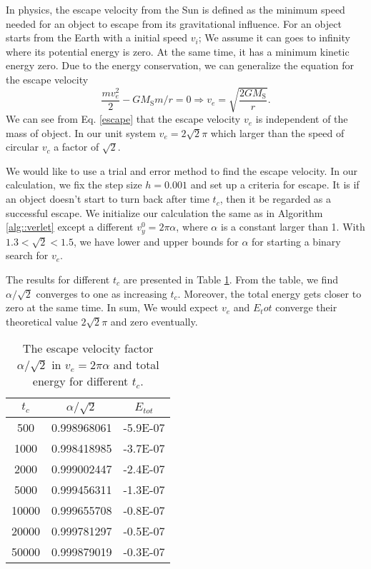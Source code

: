 In physics, the escape velocity from the Sun is defined as the minimum speed needed for an object to escape from its gravitational influence.
For an object starts from the Earth with a initial speed $v_i$; 
We assume it can goes to infinity where its potential energy is zero. 
At the same time, it has a minimum kinetic energy zero.
Due to the energy conservation, we can generalize the equation for the escape velocity
\begin{equation}
	\label{escape}
	\frac{mv_e^2}{2} - GM_{\mathrm{S}}m/r = 0\Longrightarrow v_e = \sqrt{\frac{2GM_{\mathrm{S}}}{r}}.
\end{equation}
We can see from Eq. \ref{escape} that the escape velocity $v_e$ is independent of the mass of object.
In our unit system $v_e = 2\sqrt{2}\pi$ which larger than the speed of circular $v_c$ a factor of $\sqrt{2}$.

We would like to use a trial and error method to find the escape velocity.
In our calculation, we fix the step size $h=0.001$ and set up a criteria for escape.
It is if an object doesn't start to turn back after time $t_c$, then it be regarded as a successful escape.
We initialize our calculation the same as in Algorithm \ref{alg::verlet} except a different $v_{y}^0=2\pi \alpha$, where $\alpha$ is a constant larger than 1.
With $1.3<\sqrt{2}<1.5$, we have lower and upper bounds for $\alpha$ for starting a binary search for $v_e$.

The results for different $t_c$ are presented in Table \ref{tab::escape}. 
From the table, we find $\alpha/\sqrt{2}$ converges to one as increasing $t_c$. 
Moreover, the total energy gets closer to zero at the same time.
In sum, We would expect $v_e$ and $E_tot$ converge their theoretical value $2\sqrt{2}\pi$ and zero eventually. 

\begin{table}[tb]
	\centering
	\caption{The escape velocity factor $\alpha/\sqrt{2}$ in $v_e=2\pi \alpha$ and total energy for different $t_c$.}
	\label{my-label}
	\label{tab::escape}
	\begin{tabular}{ccc}
	\hline
	\hline
	$t_c$  & $\alpha/\sqrt{2}$          & $E_{tot}$          \\
	\hline
	500   & 0.998968061 & -5.9E-07 \\
	1000  & 0.998418985 & -3.7E-07 \\
	2000  & 0.999002447 & -2.4E-07 \\
	5000  & 0.999456311 & -1.3E-07 \\
	10000 & 0.999655708 & -0.8E-07 \\
	20000 & 0.999781297 & -0.5E-07 \\
	50000 & 0.999879019 & -0.3E-07\\
	\hline
	\hline
	\end{tabular}
\end{table}
	
